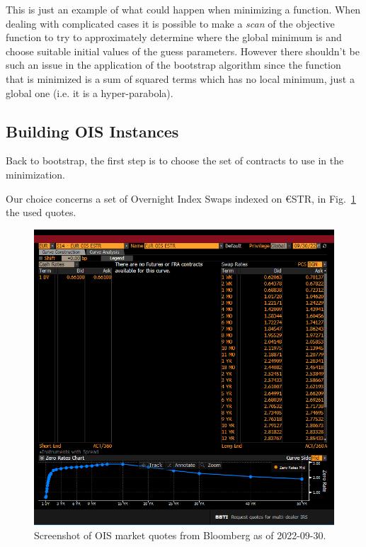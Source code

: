 This is just an example of what could happen when minimizing a function. When dealing with complicated cases it is possible to make a \emph{scan} of the objective function to try to approximately determine where the global minimum is and choose suitable initial values of the guess parameters.
However there shouldn't be such an issue in the application of the bootstrap algorithm since the function that is minimized is a sum of squared terms which has no local minimum, just a global one (i.e. it is a hyper-parabola).

\subsection{Building OIS Instances}
\label{building-ois-instances}

Back to bootstrap, the first step is to choose the set of contracts to use in the minimization.


Our choice concerns a set of Overnight Index Swaps indexed on \euro STR, in Fig.~\ref{fig:icap} the used quotes.
 
\begin{figure}[bth]
	\centering
	\includegraphics[width=1.\linewidth]{figures/bbg_ois}
	\caption{Screenshot of OIS market quotes from Bloomberg as of 2022-09-30.}
	\label{fig:icap}
\end{figure}

